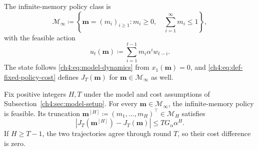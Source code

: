 The infinite-memory policy class is
\begin{equation}
\label{ch4:eq:def-infinite-simplex}
\mathcal M_\infty
\coloneqq\left\{\mathbf m=(m_i)_{i\ge1}:m_i\ge0,\quad
\sum_{i=1}^{\infty}m_i\le1\right\},
\end{equation}
with the feasible action
\begin{equation}
\label{ch4:eq:def-infinite-sdac-policy}
u_t(\mathbf m)\coloneqq\sum_{i=1}^{t-1}m_i\alpha^iw_{t-i}.
\end{equation}
The state follows \eqref{ch4:eq:model-dynamics} from $x_1(\mathbf m)=0$,
and \eqref{ch4:eq:def-fixed-policy-cost} defines $J_T(\mathbf m)$ for
$\mathbf m\in\mathcal M_\infty$ as well.

\begin{Thm:Lemma}
\label{ch4:lem:sdac-truncation-approx}
Fix positive integers $H,T$ under the model and cost assumptions of
Subsection~\ref{ch4:sec:model-setup}.
For every $\mathbf m\in\mathcal M_\infty$, the infinite-memory policy is
feasible. Its truncation
$\mathbf m^{[H]}\coloneqq(m_1,\ldots,m_H)^\top\in\mathcal M_H$ satisfies
\begin{equation}
\label{ch4:eq:sdac-truncation-cost-gap}
\left|J_T(\mathbf m^{[H]})-J_T(\mathbf m)\right|
\le TG_\alpha\alpha^H.
\end{equation}
If $H\ge T-1$, the two trajectories agree through round $T$, so their
cost difference is zero.
\end{Thm:Lemma}
